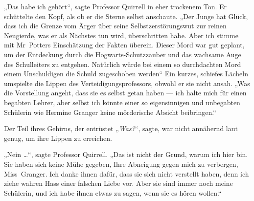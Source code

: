 „Das habe ich gehört“, sagte Professor Quirrell in eher trockenem Ton. Er schüttelte den Kopf, als ob er die Sterne selbst anschaute.
„Der Junge hat Glück, dass ich die Grenze vom Ärger über seine Selbstzerstörungswut zur reinen Neugierde, was er als Nächstes tun wird, überschritten habe. Aber ich stimme mit Mr~Potters Einschätzung der Fakten überein. Dieser Mord war gut geplant, um der Entdeckung durch die Hogwarts-Schutzzauber und das wachsame Auge des Schulleiters zu entgehen. Natürlich würde bei einem so durchdachten Mord einem Unschuldigen die Schuld zugeschoben werden“
Ein kurzes, schiefes Lächeln umspielte die Lippen des Verteidigungsprofessors, obwohl er sie nicht ansah.
„Was die Vorstellung angeht, dass sie es selbst getan haben — ich halte mich für einen begabten Lehrer, aber selbst ich könnte einer so eigensinnigen und unbegabten Schülerin wie Hermine Granger keine mörderische Absicht beibringen.“

Der Teil ihres Gehirns, der entrüstet
„\emph{Was?}“, sagte, war nicht annähernd laut genug, um ihre Lippen zu erreichen.

„Nein …“, sagte Professor Quirrell.
„Das ist nicht der Grund, warum ich hier bin. Sie haben sich keine Mühe gegeben, Ihre Abneigung gegen mich zu verbergen, Miss~Granger. Ich danke ihnen dafür, dass sie sich nicht verstellt haben, denn ich ziehe wahren Hass einer falschen Liebe vor. Aber sie sind immer noch meine Schülerin, und ich habe ihnen etwas zu sagen, wenn sie es hören wollen.“


